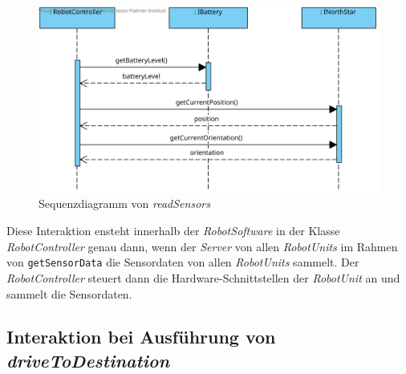 \begin{figure}[H]
	\centering
	\includegraphics[width=1\textwidth]{img/8-readSensor}
	\caption{Sequenzdiagramm von \emph{readSensors}}
	\label{ReadSensorsInteraktion} 
\end{figure}
Diese Interaktion ensteht innerhalb der \textit{RobotSoftware} in der Klasse \textit{RobotController} genau dann, wenn der \textit{Server} von allen \textit{RobotUnits} im Rahmen von \texttt{getSensorData} die Sensordaten von allen  \textit{RobotUnits} sammelt. Der \textit{RobotController} steuert dann die Hardware-Schnittstellen der \textit{RobotUnit} an und sammelt die Sensordaten.
\\
	
\subsection*{Interaktion bei Ausführung von \textit{driveToDestination}}


